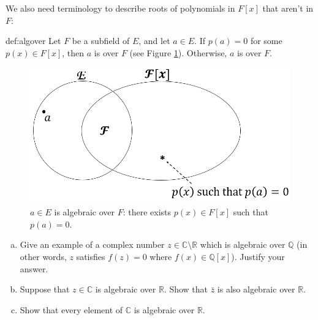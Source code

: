 
We also need terminology to describe roots of polynomials in $F[x]$ that aren't in $F$:

\begin{defn}{def:algover}  
Let $F$ be a subfield of $E$, and let $a\in E$. If $p(a)=0$ for some $p(x) \in F[x]$, then $a$ is  over $F$ (see Figure \ref{algebraicelement}). Otherwise, $a$  is  over $F$.
\end{defn}

\begin{figure}
\begin{center}
\includegraphics[scale=0.35]{images/algebraic_element.png}
\caption{$a\in E$ is algebraic over $F$:  there exists $p(x)\in F[x]$ such that $p(a)=0$.}\label{algebraicelement}
\end{center}
\end{figure}

\begin{exercise}{}
\begin {enumerate}[(a)]
\item
Give an example of a complex number $z \in \mathbb{C}\setminus \mathbb{R}$ which is algebraic over $\mathbb{Q}$ (in other words, $z$ satisfies $f(z)=0$ where $f(x) \in \mathbb Q[x]$). Justify your answer.
\item
Suppose that $z \in \mathbb{C}$ is algebraic over $\mathbb{R}$. Show that $\bar{z}$ is also algebraic over $\mathbb{R}$.
\item
Show that every element of $\mathbb{C}$ is algebraic over $\mathbb{R}$.
\end{enumerate}
\end{exercise}


